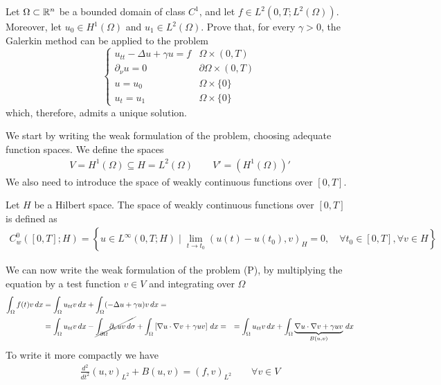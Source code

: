 \newpage
\begin{exercise}
    Let \(\Omega \subset \mathbb{R}^n\) be a bounded domain of class \(C^1\), and let \(f \in L^2(0, T; L^2(\Omega))\). Moreover, let \(u_0 \in H^1(\Omega)\) and \(u_1 \in L^2(\Omega)\). Prove that, for every \(\gamma > 0\), the Galerkin method can be applied to the problem
    \[
        \begin{cases}
            u_{tt} - \Delta u + \gamma u = f & \Omega \times (0, T) \\
            \partial_\nu u = 0 & \partial\Omega \times (0, T) \\
            u = u_0 & \Omega \times \{0\} \\
            u_t = u_1 & \Omega \times \{0\}
        \end{cases}
        \tag*{(P)}
    \]
    which, therefore, admits a unique solution.
\end{exercise}
We start by writing the weak formulation of the problem, choosing adequate function spaces. We define the spaces
\[
    \begin{split}
        V = H^1(\Omega) \subseteq H = L^2(\Omega) \qquad V' = \left(H^1(\Omega)\right)'
    \end{split}
\]
We also need to introduce the space of weakly continuous functions over \([0, T]\).
\begin{remark}
    Let \(H\) be a Hilbert space. The space of weakly continuous functions over \([0, T]\) is defined as
    \[
        \begin{split}
            C_w^0([0, T]; H) = \left\{ u \in L^\infty(0, T; H) \mid \lim_{t \to t_0} (u(t) - u(t_0), v)_H = 0, \quad \forall t_0 \in [0, T], \forall v \in H \right\}
        \end{split}
    \] 
\end{remark}
We can now write the weak formulation of the problem (P), by multiplying the equation by a test function \(v \in V\) and integrating over \(\Omega\)
\begin{align*}
    \int_\Omega f(t) v \, dx &= \int_\Omega u_{tt} v \, dx + \int_\Omega (-\Delta u  + \gamma u)v \, dx =\\
    &= \int_\Omega u_{tt} v \, dx - \cancel{\int_{\partial\Omega} \partial_\nu u v \, d\sigma} + \int_\Omega \left[\nabla u \cdot \nabla v + \gamma u v\right] \, dx =
    &= \int_\Omega u_{tt} v \, dx + \int_\Omega \underbrace{\nabla u \cdot \nabla v + \gamma u v}_{B(u, v)} \, dx
\end{align*}
To write it more compactly we have 
\[
    \begin{split}
        \frac{d^2}{dt^2} (u, v)_{L^2} + B(u, v) = (f, v)_{L^2} \qquad \forall v \in V
    \end{split}
\]
